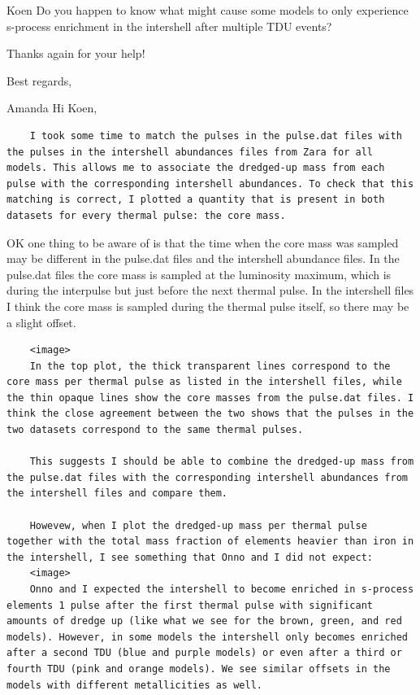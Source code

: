 \documentclass[a4paper,10pt]{article}
\begin{document}
\begin{minipage}{1.55\textwidth}
\begin{shadequote}{Koen}
Do you happen to know what might cause some models to only experience s-process enrichment in the intershell after multiple TDU events?

Thanks again for your help!

Best regards,
\end{shadequote}
\end{minipage}

\hspace{0.1\textwidth}\begin{minipage}{1.45\textwidth}
\begin{shadequote}{Amanda}
Hi Koen,
 
\begin{verbatim}
    I took some time to match the pulses in the pulse.dat files with the pulses in the intershell abundances files from Zara for all models. This allows me to associate the dredged-up mass from each pulse with the corresponding intershell abundances. To check that this matching is correct, I plotted a quantity that is present in both datasets for every thermal pulse: the core mass. 
\end{verbatim}

OK one thing to be aware of is that the time when the core mass was sampled may be different in the pulse.dat files and the intershell abundance files. In the pulse.dat files the core mass is sampled at the luminosity maximum, which is during the interpulse but just before the next thermal pulse. In the intershell files I think the core mass is sampled during the thermal pulse itself, so there may be a slight offset. 

\begin{verbatim}
    <image>
    In the top plot, the thick transparent lines correspond to the core mass per thermal pulse as listed in the intershell files, while the thin opaque lines show the core masses from the pulse.dat files. I think the close agreement between the two shows that the pulses in the two datasets correspond to the same thermal pulses.

    This suggests I should be able to combine the dredged-up mass from the pulse.dat files with the corresponding intershell abundances from the intershell files and compare them.

    Howevew, when I plot the dredged-up mass per thermal pulse together with the total mass fraction of elements heavier than iron in the intershell, I see something that Onno and I did not expect:
    <image>
    Onno and I expected the intershell to become enriched in s-process elements 1 pulse after the first thermal pulse with significant amounts of dredge up (like what we see for the brown, green, and red models). However, in some models the intershell only becomes enriched after a second TDU (blue and purple models) or even after a third or fourth TDU (pink and orange models). We see similar offsets in the models with different metallicities as well.


\end{verbatim}
\end{shadequote}
\end{minipage}
\end{document}
